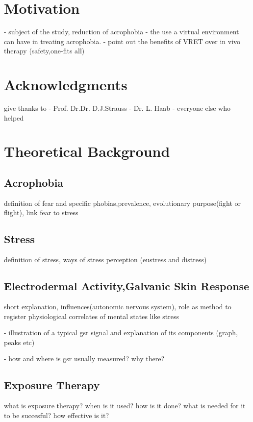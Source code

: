 

\section{Motivation}
- subject of the study, reduction of acrophobia
- the use a virtual environment can have in treating acrophobia.
- point out the benefits of VRET over in vivo therapy (safety,one-fits all)

\section{Acknowledgments}

give thanks to
- Prof. Dr.Dr. D.J.Strauss
- Dr. L. Haab
- everyone else who helped

\section{Theoretical Background}

\subsection{Acrophobia} 
  definition of fear and specific phobias,prevalence, evolutionary 	 purpose(fight or flight),
  link fear to stress
  
\subsection{Stress}
definition of stress, ways of stress perception (eustress and distress)

\subsection{Electrodermal Activity,Galvanic Skin Response}
short explanation, influences(autonomic nervous system), role as method  to register physiological correlates of mental states like stress

- illustration of a typical gsr signal and explanation of its components (graph, peaks etc)  

- how and where is gsr usually measured? why there?

\subsection{Exposure Therapy}
what is exposure therapy? 
when is it used? 
how is it done? 
what is needed for it to be succesful? 
how effective is it?
